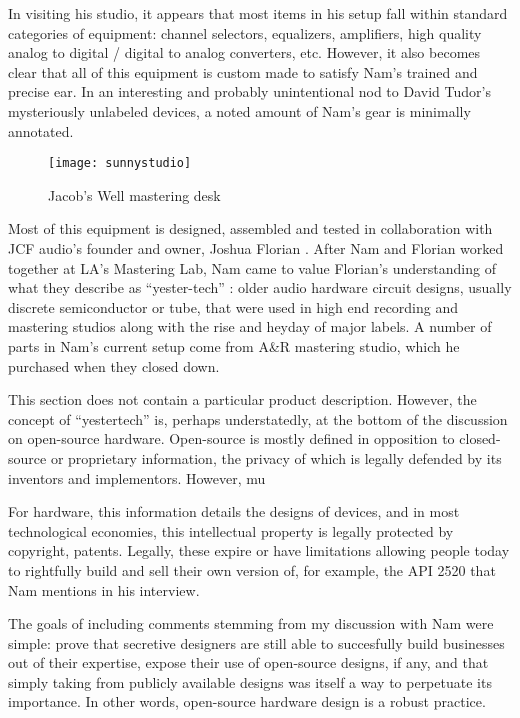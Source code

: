 In visiting his studio, it appears that most items in his setup fall within standard categories of equipment: channel selectors, equalizers, amplifiers, high quality analog to digital / digital to analog converters, etc. However, it also becomes clear that all of this equipment is custom made to satisfy Nam's trained and precise ear. In an interesting and probably unintentional nod to David Tudor's mysteriously unlabeled devices, a noted amount of Nam's gear is minimally annotated. 

	\begin{figure}[h!]
	  \caption{Jacob's Well mastering desk}
	  \centering
	    \texttt{[image: sunnystudio]}
	\end{figure}
	
Most of this equipment is designed, assembled and tested in collaboration with JCF audio's founder and owner, Joshua Florian \citep{florian2015}. After Nam and Florian worked together at LA's Mastering Lab, Nam came to value Florian's understanding of what they describe as ``yester-tech'' \citep{florian2015b}: older audio hardware circuit designs, usually discrete semiconductor or tube, that were used in high end recording and mastering studios along with the rise and heyday of major labels. A number of parts in Nam's current setup come from A\&R mastering studio, which he purchased when they closed down. 

This section does not contain a particular product description. However, the concept of ``yestertech'' is, perhaps understatedly, at the bottom of the discussion on open-source hardware. Open-source is mostly defined in opposition to closed-source or proprietary information, the privacy of which is legally defended by its inventors and implementors. However, mu

For hardware, this information details the designs of devices, and in most technological economies, this intellectual property is legally protected by copyright, patents. Legally, these expire or have limitations allowing people today to rightfully build and sell their own version of, for example, the API 2520 that Nam mentions in his interview. 

The goals of including comments stemming from my discussion with Nam were simple: prove that secretive designers are still able to succesfully build businesses out of their expertise, expose their use of open-source designs, if any, and that simply taking from publicly available designs was itself a way to perpetuate its importance. In other words, open-source hardware design is a robust practice. 

